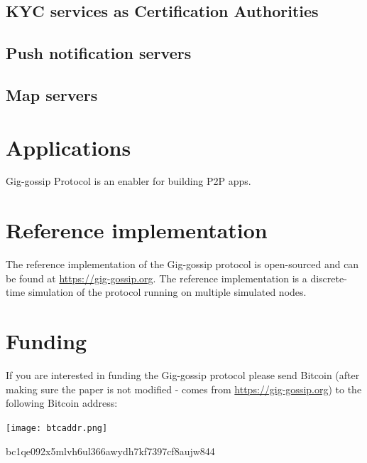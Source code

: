 \documentclass{article}
\begin{document}
\subsection{KYC services as Certification Authorities}

\subsection{Push notification servers}

\subsection{Map servers}

\section{Applications}

Gig-gossip Protocol is an enabler for building P2P apps.

\section{Reference implementation}
The reference implementation of the Gig-gossip protocol is open-sourced and can be found at \url{https://gig-gossip.org}. The reference implementation is a discrete-time simulation of the protocol running on multiple simulated nodes.

\section{Funding}
If you are interested in funding the Gig-gossip protocol please send Bitcoin (after making sure the paper is not modified - comes from \url{https://gig-gossip.org}) to the following Bitcoin address:

\texttt{[image: btcaddr.png]}

bc1qe092x5mlvh6ul366awydh7kf7397cf8aujw844
\end{document}
